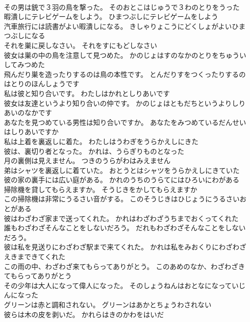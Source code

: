 \documentclass[8pt]{extreport}
\begin{document}
\begin{CJK}{UTF8}{min}
\\	その男は銃で３羽の鳥を撃った。	そのおとこはじゅうで３わのとりをうった 
\\	暇潰しにテレビゲームをしよう。	ひまつぶしにテレビゲームをしよう 
\\	汽車旅行には読書がよい暇潰しになる。	きしゃりょこうにどくしょがよいひまつぶしになる 
\\	それを巣に戻しなさい。	それをすにもどしなさい 
\\	彼女は巣の中の鳥を注意して見つめた。	かのじょはすのなかのとりをちゅういしてみつめた 
\\	飛んだり巣を造ったりするのは鳥の本性です。	とんだりすをつくったりするのはとりのほんしょうです 
\\	私は彼と知り合いです。	わたしはかれとしりあいです 
\\	彼女は友達というより知り合いの仲です。	かのじょはともだちというよりしりあいのなかです 
\\	あなたを見つめている男性は知り合いですか。	あなたをみつめているだんせいはしりあいですか 
\\	私は上着を裏返しに着た。	わたしはうわぎをうらかえしにきた 
\\	彼は、裏切り者となった。	かれは、うらぎりものとなった 
\\	月の裏側は見えません。	つきのうらがわはみえません 
\\	弟はシャツを裏返しに着ていた。	おとうとはシャツをうらかえしにきていた 
\\	彼の家の裏手には広い庭がある。	かれのうちのうらてにはひろいにわがある 
\\	掃除機を貸してもらえますか。	そうじきをかしてもらえますか 
\\	この掃除機は非常にうるさい音がする。	このそうじきはひじょうにうるさいおとがある 
\\	彼はわざわざ家まで送ってくれた。	かれはわざわざうちまでおくってくれた 
\\	誰もわざわざそんなことをしないだろう。	だれもわざわざそんなことをしないだろう。 
\\	彼は私を見送りにわざわざ駅まで来てくれた。	かれは私をみおくりにわざわざえきまできてくれた 
\\	この雨の中、わざわざ来てもらってありがとう。	このあめのなか、わざわざきてもらってありがとう 
\\	その少年は大人になって偉人になった。	そのしょうねんはおとなになっていじんになった 
\\	グリーンは赤と調和されない。	グリーンはあかとちょうわされない 
\\	彼らは木の皮を剥いだ。	かれらはきのかわをはいだ 

\end{CJK}
\end{document}
